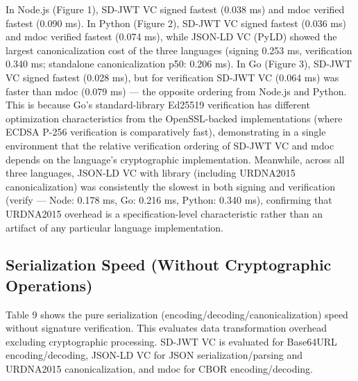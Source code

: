 \documentclass[conference]{IEEEtran}
\begin{document}
In Node.js (Figure 1), SD-JWT VC signed fastest (0.038 ms) and mdoc verified fastest (0.090 ms). In Python (Figure 2), SD-JWT VC signed fastest (0.036 ms) and mdoc verified fastest (0.074 ms), while JSON-LD VC (PyLD) showed the largest canonicalization cost of the three languages (signing 0.253 ms, verification 0.340 ms; standalone canonicalization p50: 0.206 ms). In Go (Figure 3), SD-JWT VC signed fastest (0.028 ms), but for verification SD-JWT VC (0.064 ms) was faster than mdoc (0.079 ms) --- the opposite ordering from Node.js and Python. This is because Go's standard-library Ed25519 verification has different optimization characteristics from the OpenSSL-backed implementations (where ECDSA P-256 verification is comparatively fast), demonstrating in a single environment that the relative verification ordering of SD-JWT VC and mdoc depends on the language's cryptographic implementation. Meanwhile, across all three languages, JSON-LD VC with library (including URDNA2015 canonicalization) was consistently the slowest in both signing and verification (verify --- Node: 0.178 ms, Go: 0.216 ms, Python: 0.340 ms), confirming that URDNA2015 overhead is a specification-level characteristic rather than an artifact of any particular language implementation.

\subsection{Serialization Speed (Without Cryptographic Operations)}

Table 9 shows the pure serialization (encoding/decoding/canonicalization) speed without signature verification. This evaluates data transformation overhead excluding cryptographic processing. SD-JWT VC is evaluated for Base64URL encoding/decoding, JSON-LD VC for JSON serialization/parsing and URDNA2015 canonicalization, and mdoc for CBOR encoding/decoding.
\end{document}
